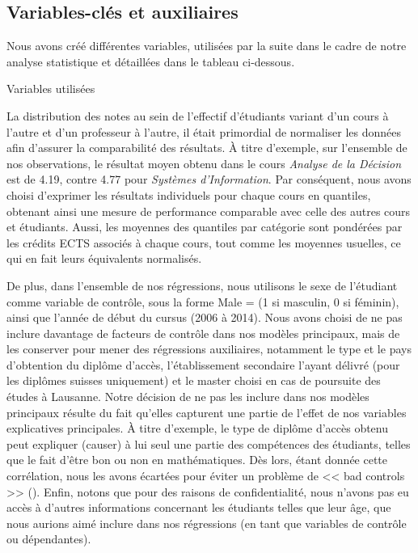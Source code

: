 \subsection{Variables-clés et auxiliaires}

Nous avons créé différentes variables, utilisées par la suite dans le cadre de notre analyse statistique et détaillées dans le tableau ci-dessous.

\begin{table}[H]
\noindent\makebox[\textwidth]{%

}%
\caption{Variables utilisées}
\label{tab:summary}
\end{table}

La distribution des notes au sein de l'effectif d'étudiants variant d'un cours à l'autre et d'un professeur à l'autre, il était primordial de normaliser les données afin d'assurer la comparabilité des résultats. À titre d'exemple, sur l'ensemble de nos observations, le résultat moyen obtenu dans le cours \textit{Analyse de la Décision} est de 4.19, contre 4.77 pour \textit{Systèmes d'Information}. Par conséquent, nous avons choisi d'exprimer les résultats individuels pour chaque cours en quantiles, obtenant ainsi une mesure de performance comparable avec celle des autres cours et étudiants. Aussi, les moyennes des quantiles par catégorie sont pondérées par les crédits ECTS associés à chaque cours, tout comme les moyennes usuelles, ce qui en fait leurs équivalents normalisés.

De plus, dans l’ensemble de nos régressions, nous utilisons le sexe de l’étudiant comme variable de contrôle, sous la forme  Male = (1 si masculin, 0 si féminin), ainsi que l'année de début du cursus (2006 à 2014). Nous avons choisi de ne pas inclure davantage de facteurs de contrôle dans nos modèles principaux, mais de les conserver pour mener des régressions auxiliaires, notamment le type et le pays d'obtention du diplôme d’accès, l’établissement secondaire l'ayant délivré (pour les diplômes suisses uniquement) et le master choisi en cas de poursuite des études à Lausanne. Notre décision de ne pas les inclure dans nos modèles principaux résulte du fait qu’elles capturent une partie de l’effet de nos variables explicatives principales. À titre d’exemple, le type de diplôme d’accès obtenu peut expliquer (causer) à lui seul une partie des compétences des étudiants, telles que le fait d’être bon ou non en mathématiques. Dès lors, étant donnée cette corrélation, nous les avons écartées pour éviter un problème de << bad controls >> (\cite{angrist}). Enfin, notons que pour des raisons de confidentialité, nous n'avons pas eu accès à d'autres informations concernant les étudiants telles que leur âge, que nous aurions aimé inclure dans nos régressions (en tant que variables de contrôle ou dépendantes).

